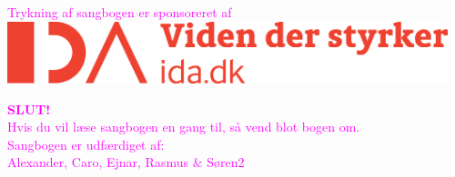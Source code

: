 \newpage
{}
\pagecolor{sort}

\pagestyle{empty}
\begin{center}

{\large\textcolor{Magenta}{Trykning af sangbogen er sponsoreret af \vspace{2cm}}} \\
\includegraphics[width=0.96\textwidth]{res/idabred.eps} \\

%
%

\vspace{7cm}

{\Huge \textbf{\textcolor{Magenta}{SLUT!}}}\\
{\large\textcolor{Magenta}{ Hvis du vil læse sangbogen en gang til, så vend blot bogen
  om.}}\\
\vspace{0.5cm}
\textcolor{Magenta}{Sangbogen er udfærdiget af:\\
Alexander, Caro, Ejnar, Rasmus \& Søren2}
\end{center}

